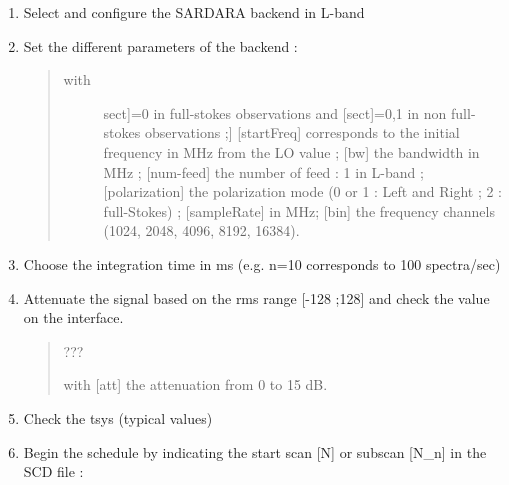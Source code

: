 \documentclass[letterpaper,10pt,english]{sphinxmanual}
\begin{document}
\begin{enumerate}
\begin{quote}
\end{quote}

\item {} 
Select and configure the SARDARA backend in L-band
\begin{quote}


\end{quote}

\item {} 
Set the different parameters of the backend :
\begin{quote}

\begin{description}
\item[{with}] \leavevmode{[}{[}sect{]}=0 in full-stokes observations and {[}sect{]}=0,1 in non full-stokes observations ;{]}
{[}startFreq{]} corresponds to the initial frequency in MHz from the LO value ;
{[}bw{]} the bandwidth in MHz ;
{[}num-feed{]} the number of feed : 1 in L-band ;
{[}polarization{]} the polarization mode (0 or 1 : Left and
Right ; 2 : full-Stokes) ;
{[}sampleRate{]} in MHz;
{[}bin{]} the frequency channels (1024, 2048, 4096, 8192, 16384).

\end{description}
\end{quote}

\item {} 
Choose the integration time in ms (e.g. n=10 corresponds to 100 spectra/sec)
\begin{quote}

\end{quote}

\item {} 
Attenuate the signal based on the rms range {[}-128 ;128{]} and check the value on the interface.
\begin{quote}

  ???

    with {[}att{]} the attenuation from 0 to 15 dB.
\end{quote}

\item {} 
Check the tsys (typical values)
\begin{quote}

\end{quote}

\item {} 
Begin the schedule by indicating the start scan {[}N{]} or subscan {[}N\_n{]} in the SCD file :
\begin{quote}

\end{quote}

\end{enumerate}
\end{document}
